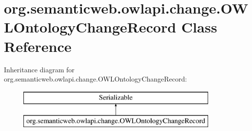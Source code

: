 \hypertarget{classorg_1_1semanticweb_1_1owlapi_1_1change_1_1_o_w_l_ontology_change_record}{\section{org.\-semanticweb.\-owlapi.\-change.\-O\-W\-L\-Ontology\-Change\-Record Class Reference}
\label{classorg_1_1semanticweb_1_1owlapi_1_1change_1_1_o_w_l_ontology_change_record}
}
Inheritance diagram for org.\-semanticweb.\-owlapi.\-change.\-O\-W\-L\-Ontology\-Change\-Record\-:\begin{figure}[H]
\begin{center}
\leavevmode
\includegraphics[height=2.000000cm]{classorg_1_1semanticweb_1_1owlapi_1_1change_1_1_o_w_l_ontology_change_record}
\end{center}
\end{figure}
